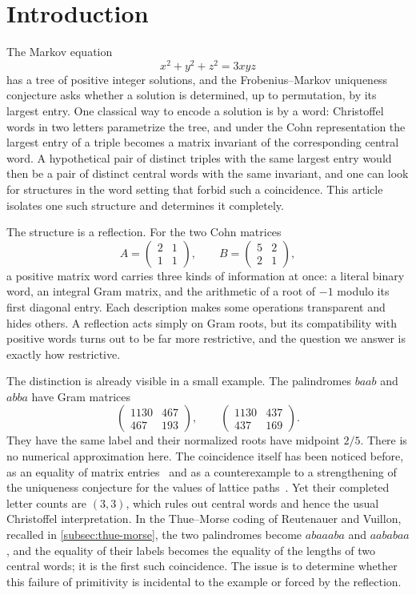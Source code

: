 \section{Introduction}
\label{sec:introduction}

The Markov equation
$$
 x^2+y^2+z^2=3xyz
$$
has a tree of positive integer solutions, and the Frobenius--Markov
uniqueness conjecture asks whether a solution is determined, up to permutation, by
its largest entry. One classical way to encode a solution is by a word:
Christoffel words in two letters parametrize the tree, and under the Cohn
representation the largest entry of a triple becomes a matrix invariant of
the corresponding central word. A hypothetical pair of distinct triples
with the same largest entry would then be a pair of distinct central words
with the same invariant, and one can look for structures in the word
setting that forbid such a coincidence. This article isolates one such
structure and determines it completely.

The structure is a reflection. For the two Cohn matrices
$$
 A=\begin{pmatrix}2&1\\1&1\end{pmatrix},\qquad
 B=\begin{pmatrix}5&2\\2&1\end{pmatrix},
$$
a positive matrix word carries three kinds of information at once: a
literal binary word, an integral Gram matrix, and the arithmetic of a root
of $-1$ modulo its first diagonal entry. Each description makes some
operations transparent and hides others. A reflection acts simply on Gram
roots, but its compatibility with positive words turns out to be far more
restrictive, and the question we answer is exactly how restrictive.

The distinction is already visible in a small example. The palindromes
$baab$ and $abba$ have Gram matrices
$$
 \begin{pmatrix}1130&467\\467&193\end{pmatrix},\qquad
 \begin{pmatrix}1130&437\\437&169\end{pmatrix}.
$$
They have the same label and their normalized roots have midpoint $2/5$.
There is no numerical approximation here. The coincidence itself has been noticed
before, as an equality of matrix entries~\cite[p.~4]{LapointeReutenauer2021} and as
a counterexample to a strengthening of the uniqueness conjecture for the values of
lattice paths~\cite[p.~28]{LagisquetEtAl2021}. Yet their completed letter
counts are $(3,3)$, which rules out central words and hence the usual
Christoffel interpretation. In the Thue--Morse coding of Reutenauer and
Vuillon, recalled in \cref{subsec:thue-morse}, the two palindromes become
$abaaaba$ and $aababaa$, and the equality of their labels becomes the equality
of the lengths of two central words; it is the first such coincidence. The issue is to
determine whether this
failure of primitivity is incidental to the example or forced by the
reflection.

